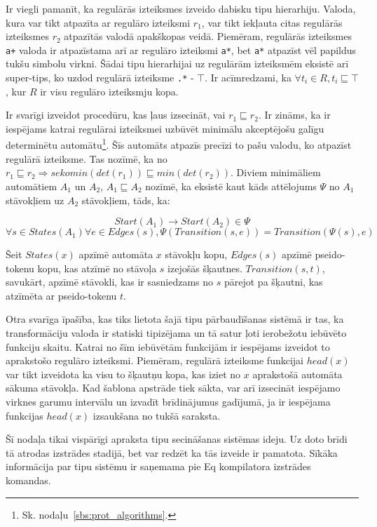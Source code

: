 Ir viegli pamanīt, ka regulārās izteiksmes izveido dabisku tipu hierarhiju. Valoda, kura var tikt atpazīta ar regulāro izteiksmi $r_1$, var tikt iekļauta citas regulārās izteiksmes $r_2$ atpazītās valodā apakškopas veidā. Piemēram, regulārās izteiksmes \verb|a+| valoda ir atpazīstama arī ar regulāro izteiksmi \verb|a*|, bet \verb|a*| atpazīst vēl papildus tukšu simbolu virkni. Šādai tipu hierarhijai uz regulārām izteiksmēm eksistē arī super-tips, ko uzdod regulārā izteiksme \verb|.*| - $\top$. Ir acīmredzami, ka $\forall t_i \in R, t_i \sqsubseteq \top$, kur $R$ ir visu regulāro izteiksmju kopa.

Ir svarīgi izveidot procedūru, kas ļaus izsecināt, vai $r_1 {\sqsubseteq} r_2$. Ir zināms, ka ir iespējams katrai regulārai izteiksmei uzbūvēt minimālu akceptējošu galīgu determinētu automātu\footnote{Sk. nodaļu~\ref{sbs:prot_algorithms}.}. Šīs automāts atpazīs precīzi to pašu valodu, ko atpazīst regulārā izteiksme. Tas nozīmē, ka no $r_1 \sqsubseteq r_2 \Rightarrow seko min (det (r_1)) \sqsubseteq min (det (r_2))$. Diviem minimāliem automātiem $A_1$ un $A_2$, $A_1 \sqsubseteq A_2$ nozīmē, ka eksistē kaut kāds attēlojums $\Psi$ no $A_1$ stāvokļiem uz $A_2$ stāvokļiem, tāds, ka:

\[
    Start (A_1) \to Start (A_2) \in \Psi
\]
\[
    \forall s \in States (A_1) \forall e \in Edges (s),
    \Psi (Transition (s, e)) = Transition (\Psi (s), e)
\]

Šeit $States (x)$ apzīmē automāta $x$ stāvokļu kopu, $Edges (s)$ apzīmē pseido-tokenu kopu, kas atzīmē no stāvoļa $s$ izejošās šķautnes. $Transition(s, t)$, savukārt, apzīmē stāvokli, kas ir sasniedzams no $s$ pārejot pa šķautni, kas atzīmēta ar pseido-tokenu $t$.

Otra svarīga īpašība, kas tiks lietota šajā tipu pārbaudīšanas sistēmā ir tas, ka transformāciju valoda ir statiski tipizējama un tā satur ļoti ierobežotu iebūvēto funkciju skaitu. Katrai no šīm iebūvētām funkcijām ir iespējams izveidot to aprakstošo regulāro izteiksmi. Piemēram, regulārā izteiksme funkcijai $head (x)$ var tikt izveidota ka visu to šķautņu kopa, kas iziet no $x$ aprakstošā automāta sākuma stāvokļa. Kad šablona apstrāde tiek sākta, var arī izsecināt iespējamo virknes garumu intervālu un izvadīt brīdinājumus gadījumā, ja ir iespējama funkcijas $head (x)$ izsaukšana no tukšā saraksta.

Šī nodaļa tikai vispārīgi apraksta tipu secināšanas sistēmas ideju. Uz doto brīdi tā atrodas izstrādes stadijā, bet var redzēt ka tās izveide ir pamatota. Sīkāka informācija par tipu sistēmu ir saņemama pie Eq kompilatora izstrādes komandas.